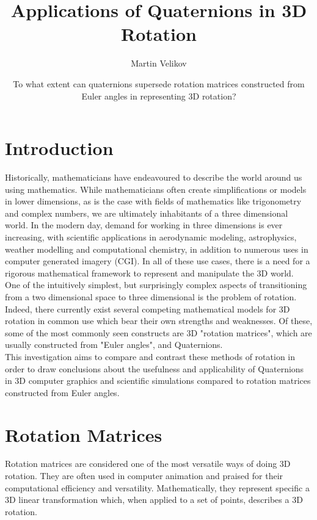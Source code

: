 \documentclass[12pt, a4paper]{article}
\title{\vspace{-1.5cm}Applications of Quaternions in 3D Rotation}
\author{Martin Velikov}
\date{To what extent can quaternions supersede rotation matrices constructed from Euler
    angles in representing 3D rotation?}
\begin{document}
\maketitle
\tableofcontents

\pagebreak

\section{Introduction}
Historically, mathematicians have endeavoured to describe the world around us
using mathematics. While mathematicians often create simplifications or models
in lower dimensions, as is the case with fields of mathematics like trigonometry
and complex numbers, we are ultimately inhabitants of a three dimensional world.
In the modern day, demand for working in three dimensions is ever increasing,
with scientific applications in aerodynamic modeling, astrophysics, weather
modelling and computational chemistry, in addition to numerous uses in computer
generated imagery (CGI). In all of these use cases, there is a need for a
rigorous mathematical framework to represent and manipulate the 3D world. \\

One of the intuitively simplest, but surprisingly complex aspects of
transitioning from a two dimensional space to three dimensional is the problem
of rotation. Indeed, there currently exist several competing mathematical models
for 3D rotation in common use which bear their own strengths and weaknesses. Of
these, some of the most commonly seen constructs are 3D "rotation matrices",
which are usually constructed from "Euler angles", and Quaternions.\\

This investigation aims to compare and contrast these methods of rotation in
order to draw conclusions about the usefulness and applicability of Quaternions
in 3D computer graphics and scientific simulations compared to rotation matrices
constructed from Euler angles.

\pagebreak

\section{Rotation Matrices}
Rotation matrices are considered one of the most versatile ways of doing 3D
rotation. They are often used in computer animation and praised for their
computational efficiency and versatility. Mathematically, they represent
specific a 3D linear transformation which, when applied to a set of points,
describes a 3D rotation.
\end{document}
